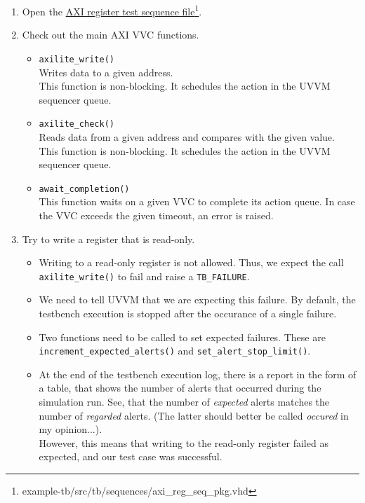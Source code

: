\begin{enumerate}
      \item Open the \href{../../example-tb/src/tb/sequences/axi\_reg\_seq\_pkg.vhd} {AXI register test sequence file}\footnote{example-tb/src/tb/sequences/axi\_reg\_seq\_pkg.vhd}.
      \item Check out the main AXI VVC functions.
            \begin{itemize}
                  \item \texttt{axilite\_write()}\\
                        Writes data to a given address.\\
                        This function is non-blocking. It schedules the action in the UVVM sequencer queue.
                  \item \texttt{axilite\_check()}\\
                        Reads data from a given address and compares with the given value.\\
                        This function is non-blocking. It schedules the action in the UVVM sequencer queue.
                  \item \texttt{await\_completion()}\\
                        This function waits on a given VVC to complete its action queue. In case the VVC exceeds the given timeout, an error is raised.\\
            \end{itemize}
      \item Try to write a register that is read-only.
            \begin{itemize}
                  \item Writing to a read-only register is not allowed. Thus, we expect the call \texttt{axilite\_write()} to fail and raise a \texttt{TB\_FAILURE}.
                  \item We need to tell UVVM that we are expecting this failure. By default, the testbench execution is stopped after the occurance of a single failure.
                  \item Two functions need to be called to set expected failures. These are \texttt{increment\_expected\_alerts()} and \texttt{set\_alert\_stop\_limit()}.
                  \item At the end of the testbench execution log, there is a report in the form of a table, that shows the number of alerts that occurred during the simulation run. See, that the number of \textit{expected} alerts matches the number of \textit{regarded} alerts. (The latter should better be called \textit{occured} in my opinion...).\\
                        However, this means that writing to the read-only register failed as expected, and our test case was successful.
            \end{itemize}
\end{enumerate}

